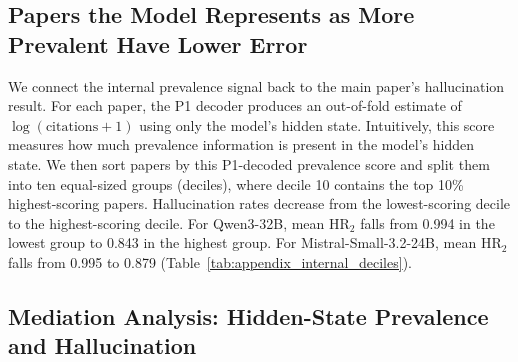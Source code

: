 \documentclass[11pt]{article}
\begin{document}
\subsection{Papers the Model Represents as More Prevalent Have Lower Error}

We connect the internal prevalence signal back to the main paper's
hallucination result.  For each paper, the P1 decoder produces an out-of-fold
estimate of $\log(\mathrm{citations}+1)$ using only the model's hidden state.
Intuitively, this score measures how much prevalence information is present in
the model's hidden state.  We then sort papers by this P1-decoded prevalence
score and split them into ten equal-sized groups (deciles), where decile 10
contains the top 10\% highest-scoring papers.  Hallucination rates decrease from
the lowest-scoring decile to the highest-scoring decile.
For Qwen3-32B, mean HR$_2$ falls from 0.994 in the lowest group to 0.843 in the
highest group.  For Mistral-Small-3.2-24B, mean HR$_2$ falls from 0.995 to 0.879
(Table~\ref{tab:appendix_internal_deciles}).

\setlength{\tabcolsep}{2pt}
\begin{table}[t]
\centering

\caption{Hallucination rate by P1-decoded prevalence decile.}
\label{tab:appendix_internal_deciles}
\end{table}

\subsection{Mediation Analysis: Hidden-State Prevalence and Hallucination}
\end{document}

